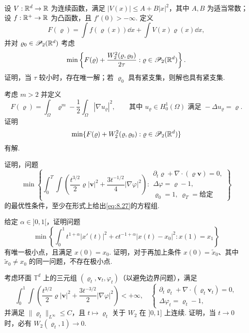 \begin{exercise}\label{ex:52}
设 $V:\mathbb R^d\to\mathbb R$ 为连续函数，满足 $|V(x)|\leq A+B|x|^2$，其中 $A,B$ 为适当常数；设 $f:\mathbb R^+\to\mathbb R$ 为凸函数，且 $f'(0)>-\infty$. 定义
\[
F(\varrho)=\int f(\varrho(x))\dd x+\int V(x)\varrho(x)\dd x,
\]
并对 $\varrho_0\in\mathscr P_2(\mathbb R^d)$ 考虑
\[
\min\left\{F(\varrho)+\frac{W_2^2(\varrho,\varrho_0)}{2\tau}:
\varrho\in\mathscr P_2(\mathbb R^d)\right\}.
\]
证明，当 $\tau$ 较小时，存在唯一解；若 $\varrho_0$ 具有紧支集，则解也具有紧支集.
\end{exercise}

\begin{exercise}\label{ex:53}
考虑 $m>2$ 并定义
\[
F(\varrho)=\int_\Omega\varrho^m-\frac12\int_\Omega|\nabla u_\varrho|^2,
\qquad\text{其中 }u_\varrho\in H_0^1(\Omega)\text{ 满足 }-\Delta u_\varrho=\varrho.
\]
证明
\[
\min\{F(\varrho)+W_2^2(\varrho,\varrho_0):\varrho\in\mathscr P_2(\mathbb R^d)\}
\]
有解.
\end{exercise}

\begin{exercise}\label{ex:54}
证明，问题
\[
\min\left\{\int_0^T\int\left(\frac{t^{3/2}}2\varrho|\mathbf v|^2
+\frac{3t^{-1/2}}4|\nabla\varphi|^2\right):
\begin{array}{l}
\partial_t\varrho+\nabla\cdot(\varrho\mathbf v)=0,\\
\Delta\varphi=\varrho-1,\\
\varrho_0=1,\ \varrho_T=\text{给定}
\end{array}\right\}
\]
的最优性条件，至少在形式上给出\eqref{eq:8.27}的方程组.
\end{exercise}

\begin{exercise}\label{ex:55}
给定 $\alpha\in ]0,1[$，证明问题
\[
\min\left\{\int_0^1t^{1+\alpha}|x'(t)|^2+ct^{-1+\alpha}|x(t)-x_0|^2:x(1)=x_1\right\}
\]
有唯一极小点，且满足 $x(0)=x_0$. 证明，对于再加上条件 $x(0)=\widetilde x_0$、其中 $\widetilde x_0\neq x_0$ 的同一问题，不存在极小点.
\end{exercise}

\begin{exercise}\label{ex:56}
考虑环面 $\mathbb T^d$ 上的三元组 $(\varrho_t,\mathbf v_t,\varphi_t)$（以避免边界问题），满足
\[
\int_0^1\int\left(\frac{t^{3/2}}2\varrho|\mathbf v|^2+\frac{3t^{-3/2}}2|\nabla\varphi|^2\right)<+\infty,
\quad\begin{cases}
\partial_t\varrho_t+\nabla\cdot(\varrho_t\mathbf v_t)=0,\\
\Delta\varphi_t=\varrho_t-1,
\end{cases}
\]
并满足 $\|\varrho_t\|_{L^\infty}\leq C$，且 $t\mapsto\varrho_t$ 关于 $W_2$ 在 $]0,1]$ 上连续. 证明，当 $t\to0$ 时，必有 $W_2(\varrho_t,1)\to0$.
\end{exercise}

